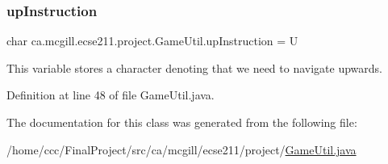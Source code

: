 \mbox{\label{classca_1_1mcgill_1_1ecse211_1_1project_1_1_game_util_a98831b92dc6ed43627755d2995cba683}} 
\subsubsection{\texorpdfstring{up\+Instruction}{upInstruction}}
{\footnotesize\ttfamily char ca.\+mcgill.\+ecse211.\+project.\+Game\+Util.\+up\+Instruction = \textquotesingle{}U\textquotesingle{}\hspace{0.3cm}{\ttfamily [static]}}

This variable stores a character denoting that we need to navigate upwards. 

Definition at line 48 of file Game\+Util.\+java.



The documentation for this class was generated from the following file\+:\begin{DoxyCompactItemize}
\item 
/home/ccc/\+Final\+Project/src/ca/mcgill/ecse211/project/\hyperlink{_game_util_8java}{Game\+Util.\+java}\end{DoxyCompactItemize}
